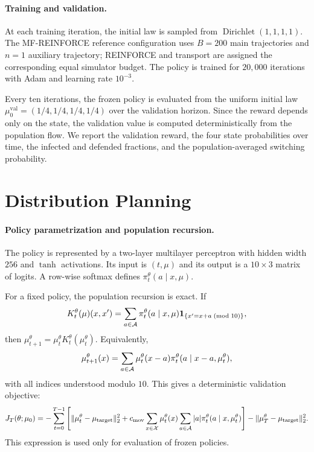 \paragraph{Training and validation.}
At each training iteration, the initial law is sampled from $\operatorname{Dirichlet}(1,1,1,1)$. The MF-REINFORCE reference configuration uses $B=200$ main trajectories and $n=1$ auxiliary trajectory; REINFORCE and transport are assigned the corresponding equal simulator budget. The policy is trained for $20{,}000$ iterations with Adam and learning rate $10^{-3}$.

Every ten iterations, the frozen policy is evaluated from the uniform initial law $\mu_0^{\mathrm{val}}=(1/4,1/4,1/4,1/4)$ over the validation horizon. Since the reward depends only on the state, the validation value is computed deterministically from the population flow. We report the validation reward, the four state probabilities over time, the infected and defended fractions, and the population-averaged switching probability.

\section{Distribution Planning}
\label{appendix:spec-distribution}

\paragraph{Policy parametrization and population recursion.}
The policy is represented by a two-layer multilayer perceptron with hidden width $256$ and $\tanh$ activations. Its input is $(t,\mu)$ and its output is a $10\times3$ matrix of logits. A row-wise softmax defines $\pi_t^\theta(a\mid x,\mu)$.

For a fixed policy, the population recursion is exact. If
\begin{align}
    K_t^\theta(\mu)(x,x')
    =
    \sum_{a\in{\cal A}}\pi_t^\theta(a\mid x,\mu)\mathbf 1_{\{x'=x+a\;(\mathrm{mod}\;10)\}},
\end{align}
then $\mu_{t+1}^\theta=\mu_t^\theta K_t^\theta(\mu_t^\theta)$. Equivalently,
\begin{align}
    \mu_{t+1}^\theta(x)
    =
    \sum_{a\in{\cal A}}
    \mu_t^\theta(x-a)\pi_t^\theta(a\mid x-a,\mu_t^\theta),
\end{align}
with all indices understood modulo $10$. This gives a deterministic validation objective:
\begin{align}
    J_T(\theta;\mu_0)
    =
    -\sum_{t=0}^{T-1}
    \left[
        \|\mu_t^\theta-\mu_{\mathrm{target}}\|_2^2
        +
        c_{\mathrm{mov}}\sum_{x\in{\cal X}}\mu_t^\theta(x)
        \sum_{a\in{\cal A}}|a|\pi_t^\theta(a\mid x,\mu_t^\theta)
    \right]
    -
    \|\mu_T^\theta-\mu_{\mathrm{target}}\|_2^2.
\end{align}
This expression is used only for evaluation of frozen policies.

